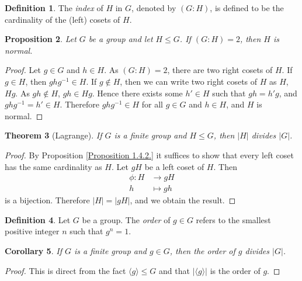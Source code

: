 \documentclass[12pt]{report}
\theoremstyle{plain}
\newtheorem{theorem}{Theorem}[section]
\newtheorem{corollary}[theorem]{Corollary}
\newtheorem{proposition}[theorem]{Proposition}
\theoremstyle{remark}
\theoremstyle{definition}
\newtheorem{definition}[theorem]{Definition}
\begin{document}
\begin{definition}
    The \emph{index} of $H$ in $G$, denoted by $(G:H)$, is defined to be the cardinality of the (left) cosets of $H$.
\end{definition}

\begin{proposition}
    Let $G$ be a group and let $H\le G$. If $(G:H)=2$, then $H$ is normal.
\end{proposition}
\begin{proof}
    Let $g\in G$ and $h\in H$. As $(G:H)=2$, there are two right cosets of $H$. If $g\in H$, then $ghg^{-1}\in H$. If $g\not\in H$, then we can write two right cosets of $H$ as $H$, $Hg$. As $gh\not\in H$, $gh\in Hg$. Hence there exists some $h'\in H$ such that $gh=h'g$, and $ghg^{-1}=h'\in H$. Therefore $ghg^{-1}\in H$ for all $g\in G$ and $h\in H$, and $H$ is normal.
\end{proof}

\begin{theorem}[Lagrange]
    If $G$ is a finite group and $H\le G$, then $|H|$ divides $|G|$.
\end{theorem}
\begin{proof}
    By Proposition \ref{Proposition 1.4.2.} it suffices to show that every left coset has the same cardinality as $H$. Let $gH$ be a left coset of $H$. Then
    \begin{align*}
        \phi:H &\rightarrow gH \\
        h&\mapsto gh
    \end{align*}
    is a bijection. Therefore $|H|=|gH|$, and we obtain the result.
\end{proof}

\begin{definition}
    Let $G$ be a group. The \emph{order} of $g\in G$ refers to the smallest positive integer $n$ such that $g^n=1$.
\end{definition}

\begin{corollary}
    If $G$ is a finite group and $g\in G$, then the order of $g$ divides $|G|$.
\end{corollary}
\begin{proof}
    This is direct from the fact $\langle g\rangle\le G$ and that $|\langle g\rangle|$ is the order of $g$.
\end{proof}
\end{document}
